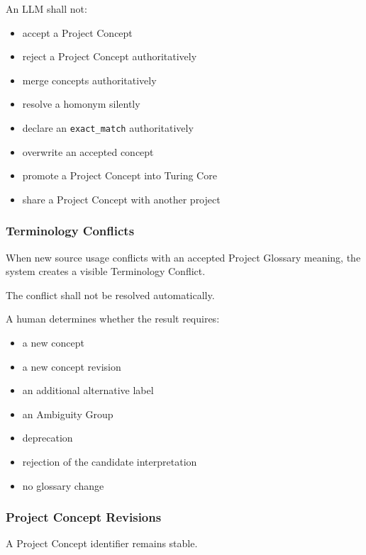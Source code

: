 An LLM shall not:

\begin{itemize}
\tightlist
\item
  accept a Project Concept
\item
  reject a Project Concept authoritatively
\item
  merge concepts authoritatively
\item
  resolve a homonym silently
\item
  declare an \texttt{exact\_match} authoritatively
\item
  overwrite an accepted concept
\item
  promote a Project Concept into Turing Core
\item
  share a Project Concept with another project
\end{itemize}

\hypertarget{terminology-conflicts}{%
\subsubsection{Terminology Conflicts}\label{terminology-conflicts}}

When new source usage conflicts with an accepted Project Glossary meaning, the system creates a visible Terminology Conflict.

The conflict shall not be resolved automatically.

A human determines whether the result requires:

\begin{itemize}
\tightlist
\item
  a new concept
\item
  a new concept revision
\item
  an additional alternative label
\item
  an Ambiguity Group
\item
  deprecation
\item
  rejection of the candidate interpretation
\item
  no glossary change
\end{itemize}

\hypertarget{project-concept-revisions}{%
\subsubsection{Project Concept Revisions}\label{project-concept-revisions}}

A Project Concept identifier remains stable.

